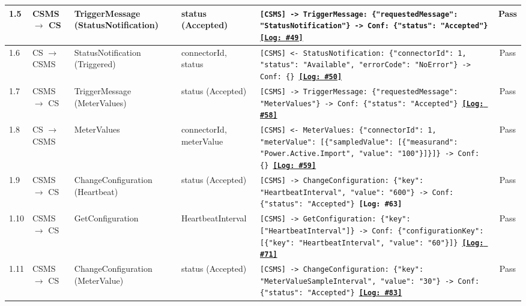 \documentclass[10pt, a4paper, landscape]{article}
\begin{document}
\begin{longtable}{|p{1.0cm}|p{2.5cm}|p{4.0cm}|p{5.0cm}|p{10.0cm}|c|}
\hline
1.5 & CSMS $\to$ CS & TriggerMessage (StatusNotification) & status (Accepted) & \footnotesize\texttt{[CSMS] -> TriggerMessage: \{"requestedMessage": "StatusNotification"\} \newline [CS] -> Conf: \{"status": "Accepted"\} \newline \hyperref[log:1.5]{\textbf{[Log: \#49]}}} & Pass \\
\hline
1.6 & CS $\to$ CSMS & StatusNotification (Triggered) & connectorId, status & \footnotesize\texttt{[CSMS] <- StatusNotification: \{"connectorId": 1, "status": "Available", "errorCode": "NoError"\} \newline [CSMS] -> Conf: \{\} \newline \hyperref[log:1.6]{\textbf{[Log: \#50]}}} & Pass \\
\hline
1.7 & CSMS $\to$ CS & TriggerMessage (MeterValues) & status (Accepted) & \footnotesize\texttt{[CSMS] -> TriggerMessage: \{"requestedMessage": "MeterValues"\} \newline [CS] -> Conf: \{"status": "Accepted"\} \newline \hyperref[log:1.7]{\textbf{[Log: \#58]}}} & Pass \\
\hline
1.8 & CS $\to$ CSMS & MeterValues & connectorId, meterValue & \footnotesize\texttt{[CSMS] <- MeterValues: \{"connectorId": 1, "meterValue": [\{"sampledValue": [\{"measurand": "Power.Active.Import", "value": "100"\}]\}]\} \newline [CSMS] -> Conf: \{\} \newline \hyperref[log:1.8]{\textbf{[Log: \#59]}}} & Pass \\
\hline
1.9 & CSMS $\to$ CS & ChangeConfiguration (Heartbeat) & status (Accepted) & \footnotesize\texttt{[CSMS] -> ChangeConfiguration: \{"key": "HeartbeatInterval", "value": "600"\} \newline [CS] -> Conf: \{"status": "Accepted"\} \newline \textbf{[Log: \#63]}} & Pass \\
\hline
1.10 & CSMS $\to$ CS & GetConfiguration & HeartbeatInterval & \footnotesize\texttt{[CSMS] -> GetConfiguration: \{"key": ["HeartbeatInterval"]\} \newline [CS] -> Conf: \{"configurationKey": [\{"key": "HeartbeatInterval", "value": "60"\}]\} \newline \hyperref[log:1.10]{\textbf{[Log: \#71]}}} & Pass \\
\hline
1.11 & CSMS $\to$ CS & ChangeConfiguration (MeterValue) & status (Accepted) & \footnotesize\texttt{[CSMS] -> ChangeConfiguration: \{"key": "MeterValueSampleInterval", "value": "30"\} \newline [CS] -> Conf: \{"status": "Accepted"\} \newline \hyperref[log:1.11]{\textbf{[Log: \#83]}}} & Pass \\

\end{longtable}
\end{document}
